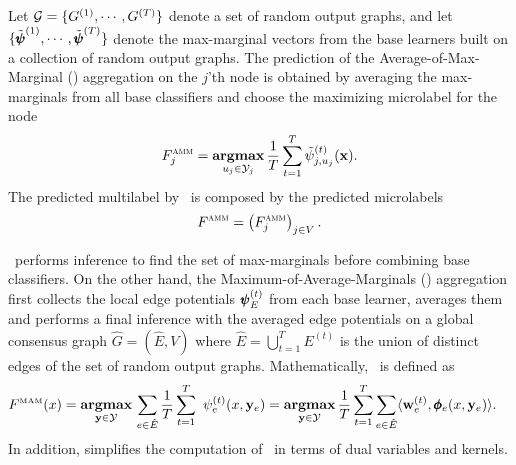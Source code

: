 {%
Let $\mathcal{G}=\{G^{(1)},\cdots,G^{(T)}\}$ denote a set of random output graphs, and let $\{\tilde{\pmb \psi}^{(1)},\cdots,\tilde{\pmb \psi}^{(T)}\}$ denote the max-marginal vectors from the base learners built on a collection of random output graphs.
The prediction of the Average-of-Max-Marginal (\amm) aggregation on the $j$'th node is obtained by averaging the max-marginals from all base classifiers and choose the maximizing microlabel for the node 
\begin{align*}
	F_j^{\text{{\sc amm}}}=\underset{u_j\in\mathcal{Y}_j}{\textbf{argmax}}\,\frac{1}{T}\sum_{t=1}^{T}\tilde{\psi}_{j,u_j}^{(t)}(\mathbf {x}).	\end{align*}
The predicted multilabel by \amm\ is composed by the predicted microlabels
\begin{align*}
	F^{\text{{\sc amm}}}=\left(F_j^{\text{{\sc amm}}}\right)_{j\in V}.
\end{align*}

\amm\ performs inference to find the set of max-marginals before combining base classifiers. 
On the other hand, the Maximum-of-Average-Marginals (\mam) aggregation first collects the local edge potentials $\pmb \psi_E^{(t)}$ from each base learner, averages them and performs a final inference with the averaged edge potentials on a global consensus graph $\hat{G}=(\hat{E},V)$ where $\hat{E}=\bigcup_{t=1}^{T}{E^{(t)}}$ is the union of distinct edges of the set of random output graphs.
Mathematically, \mam\ is defined as
\begin{align*}
	F^{\text{\tiny MAM}}(x) &= \underset{\vy \in \Ycal }{\argmax}\,\sum_{e\in \hat{E}}\frac{1}{T}\sum_{t=1}^{T}\ \psi^{(t)}_e(x,\vy_e)
	= \underset{\vy \in \Ycal}{\argmax}\, \frac{1}{T} \sum_{t=1}^T \sum_{e\in \hat{E}} \ip{\vw_e^{(t)}}{\phib_e(x,\vy_e)}. %
\end{align*}
In addition,  simplifies the computation of \mam\ in terms of dual variables and kernels.

}
